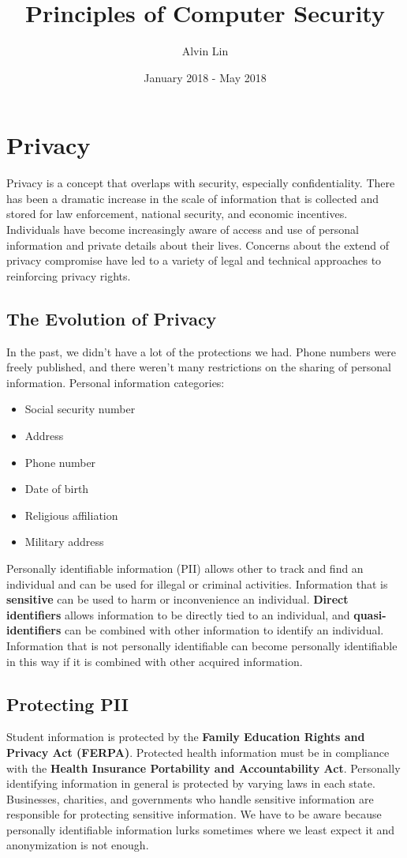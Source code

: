 \documentclass{math}
\title{Principles of Computer Security}
\author{Alvin Lin}
\date{January 2018 - May 2018}
\begin{document}
\maketitle

\section*{Privacy}
Privacy is a concept that overlaps with security, especially confidentiality.
There has been a dramatic increase in the scale of information that is collected
and stored for law enforcement, national security, and economic incentives.
Individuals have become increasingly aware of access and use of personal
information and private details about their lives. Concerns about the extend
of privacy compromise have led to a variety of legal and technical approaches
to reinforcing privacy rights.

\subsection*{The Evolution of Privacy}
In the past, we didn't have a lot of the protections we had. Phone numbers were
freely published, and there weren't many restrictions on the sharing of personal
information. Personal information categories:
\begin{itemize}
  \item Social security number
  \item Address
  \item Phone number
  \item Date of birth
  \item Religious affiliation
  \item Military address
\end{itemize}
Personally identifiable information (PII) allows other to track and find an
individual and can be used for illegal or criminal activities. Information that
is \textbf{sensitive} can be used to harm or inconvenience an individual.
\textbf{Direct identifiers} allows information to be directly tied to an
individual, and \textbf{quasi-identifiers} can be combined with other
information to identify an individual. Information that is not personally
identifiable can become personally identifiable in this way if it is combined
with other acquired information.

\subsection*{Protecting PII}
Student information is protected by the \textbf{Family Education Rights and
Privacy Act (FERPA)}. Protected health information must be in compliance with
the \textbf{Health Insurance Portability and Accountability Act}. Personally
identifying information in general is protected by varying laws in each state.
Businesses, charities, and governments who handle sensitive information are
responsible for protecting sensitive information. We have to be aware because
personally identifiable information lurks sometimes where we least expect it and
anonymization is not enough.
\end{document}
